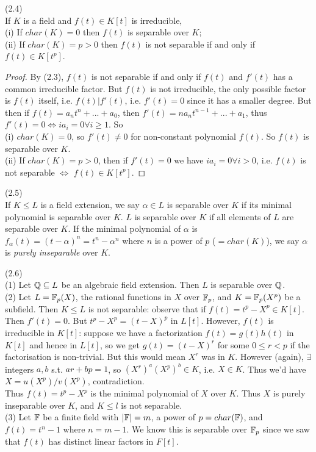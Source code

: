 \documentclass[a4paper]{article}
\begin{document}
\begin{coro} (2.4)\\
If $K$ is a field and $f(t) \in K[t]$ is irreducible,\\
(i) If $char(K) = 0$ then $f(t)$ is separable over $K$;\\
(ii) If $char(K)=p>0$ then $f(t)$ is not separable if and only if $f(t) \in K[t^p]$.
\begin{proof}
By (2.3), $f(t)$ is not separable if and only if $f(t)$ and $f'(t)$ has a common irreducible factor. But $f(t)$ is not irreducible, the only possible factor is $f(t)$ itself, i.e. $f(t) | f'(t)$, i.e. $f'(t) =0$ since it has a smaller degree. But then if $f(t) = a_n t^n + ... + a_0$, then $f'(t) = na_n t^{n-1}+...+a_1$, thus $f'(t) = 0 \iff ia_i=0 \forall i \geq 1$. So \\
(i) $char(K) = 0$, so $f'(t) \neq 0$ for non-constant polynomial $f(t)$. So $f(t)$ is separable over $K$.\\
(ii) If $char(K) = p > 0$, then if $f'(t) = 0$ we have $ia_i = 0 \forall i>0$, i.e. $f(t)$ is not separable $\iff$ $f(t) \in K[t^p]$.
\end{proof}
\end{coro}

\begin{defi}(2.5)\\
If $K \leq L$ is a field extension, we say $\alpha \in L$ is separable over $K$ if its minimal polynomial is separable over $K$. $L$ is separable over $K$ if all elements of $L$ are separable over $K$. If the minimal polynomial of $\alpha$ is $f_\alpha(t) = (t-\alpha)^n = t^n - \alpha^n$ where $n$ is a power of $p$ ($=char(K)$), we say $\alpha$ is \emph{purely inseparable} over $K$.
\end{defi}

\begin{eg} (2.6)\\
(1) Let $\mathbb{Q} \subseteq L$ be an algebraic field extension. Then $L$ is separable over $\mathbb{Q}$.\\
(2) Let $L = \mathbb{F}_p(X)$, the rational functions in $X$ over $\mathbb{F}_p$, and $K = \mathbb{F}_p (X^p)$ be a subfield. Then $K \leq L$ is not separable: observe that if $f(t) = t^p - X^p \in K[t]$. Then $f'(t) = 0$. But $t^p-X^p = (t-X)^p$ in $L[t]$. However, $f(t)$ is irreducible in $K[t]$: suppose we have a factorization $f(t) = g(t)h(t)$ in $K[t]$ and hence in $L[t]$, so we get $g(t) = (t-X)^r$ for some $0 \leq r < p$ if the factorisation is non-trivial. But this would mean $X^r$ was in $K$. However (again), $\exists$ integers $a,b$ s.t. $ar+bp=1$, so $(X^r)^a (X^p)^b \in K$, i.e. $X \in K$. Thus we'd have $X = u(X^p)/v(X^p)$, contradiction.\\
Thus $f(t) = t^p -X^p$ is the minimal polynomial of $X$ over $K$. Thus $X$ is purely inseparable over $K$, and $K \leq l$ is not separable.\\
(3) Let $\mathbb{F}$ be a finite field with $|\mathbb{F}| = m$, a power of $p = char(\mathbb{F})$, and $f(t) = t^n - 1$ where $n=m-1$. We know this is separable over $\mathbb{F}_p$ since we saw that $f(t)$ has distinct linear factors in $F[t]$.
\end{eg}
\end{document}
